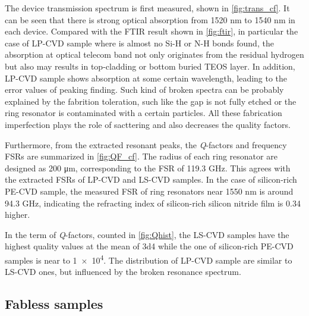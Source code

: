 The device transmission spectrum is first measured, shown in \autoref{fig:trans_cf}. It can be seen that there is strong optical absorption from 1520 nm to 1540 nm in each device. Compared with the FTIR result shown in \autoref{fig:ftir}, in particular the case of LP-CVD sample where is almost no Si-H or N-H bonds found, the absorption at optical telecom band not only originates from the residual hydrogen but also may results in top-cladding or bottom buried TEOS layer.
In addition, LP-CVD sample shows absorption at some certain wavelength, leading to the error values of peaking finding. Such kind of broken spectra can be probably explained by the fabrition toleration, such like the gap is not fully etched or the ring resonator is contaminated with a certain particles. All these fabrication imperfection plays the role of sacttering and also decreases the quality factors.

Furthermore, from the extracted resonant peaks, the \textit{Q}-factors and frequency FSRs are summarized in \autoref{fig:QF_cf}. The radius of each ring resonator are designed as 200 \si{\um}, corresponding to the FSR of 119.3 GHz. This agrees with the extracted FSRs of LP-CVD and LS-CVD samples. In the case of silicon-rich PE-CVD sample, the measured FSR of ring resonators near 1550 nm is around 94.3 GHz, indicating the refracting index of silicon-rich silicon nitride film is 0.34 higher.

In the term of \textit{Q}-factors, counted in \autoref{fig:Qhist}, the LS-CVD samples have the highest quality values at the mean of \num{3d4} while the one of silicon-rich PE-CVD samples is near to \num{1e4}. The distribution of LP-CVD sample are similar to LS-CVD ones, but influenced by the broken resonance spectrum.

\begin{figure}
	\centering
	
	\label{fig:trans_cf}
\end{figure}

\begin{figure}
	\centering
	
	\label{fig:QF_cf}
\end{figure}

\begin{figure}
	\centering
	
	\label{fig:Qhist}
\end{figure}

\subsection{Fabless samples}

